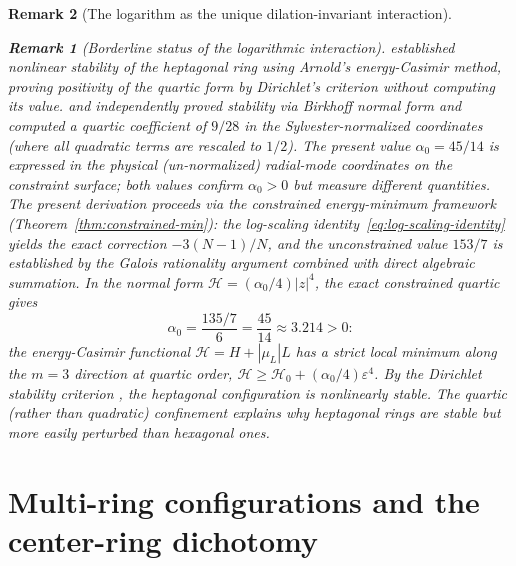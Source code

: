 \documentclass[12pt, a4paper]{article}
\newtheorem{remark}{Remark}[section]
\numberwithin{equation}{section}
\begin{document}
\begin{remark}[The logarithm as the unique dilation-invariant interaction]
\begin{remark}[Borderline status of the logarithmic interaction]
\citet{KurakinYudovich2002} established nonlinear stability of the
heptagonal ring using Arnold's energy-Casimir method, proving
positivity of the quartic form by Dirichlet's criterion without
computing its value.  \citet{CabralSchmidt1999} and
\citet{Schmidt2004} independently proved stability via Birkhoff
normal form and computed a quartic coefficient of $9/28$ in
the \emph{Sylvester-normalized} coordinates (where all quadratic
terms are rescaled to $1/2$).  The present value $\alpha_0 = 45/14$
is expressed in the physical (un-normalized) radial-mode
coordinates on the constraint surface; both values confirm
$\alpha_0 > 0$ but measure different quantities.
The present derivation proceeds via the constrained energy-minimum
framework (Theorem~\ref{thm:constrained-min}): the log-scaling
identity~\eqref{eq:log-scaling-identity} yields the exact
correction $-3(N{-}1)/N$, and the unconstrained value $153/7$ is
established by the Galois rationality argument combined with direct
algebraic summation.  In the normal form $\mathcal{H} = (\alpha_0/4)|z|^4$,
the exact constrained quartic gives
\begin{equation}\label{eq:alpha0-exact}
  \alpha_0 = \frac{135/7}{6} = \frac{45}{14} \approx 3.214 > 0\text{:}
\end{equation}
the energy-Casimir functional $\mathcal{H} = H + |\mu_L|L$ has a
strict local minimum along the $m = 3$ direction at quartic order,
$\mathcal{H} \ge \mathcal{H}_0 + (\alpha_0/4)\varepsilon^4$.  By the
Dirichlet stability criterion \citep{BoattoCabral2003}, the heptagonal
configuration is nonlinearly stable.  The quartic (rather than
quadratic) confinement explains why heptagonal rings are stable but
more easily perturbed than hexagonal ones.


\section{Multi-ring configurations and the center-ring dichotomy}
\label{sec:multiring-new}
\label{sec:multiring}


\end{remark}
\end{remark}
\end{document}
